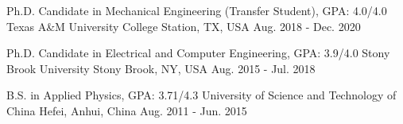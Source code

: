 

\begin{cventries}

  \cventry
    {Ph.D. Candidate in Mechanical Engineering (Transfer Student), GPA: 4.0/4.0} %
    {Texas A\&M University} %
    {College Station, TX, USA} %
    {Aug. 2018 - Dec. 2020} %
    {}

  \cventry
    {Ph.D. Candidate in Electrical and Computer Engineering, GPA: 3.9/4.0} %
    {Stony Brook University} %
    {Stony Brook, NY, USA} %
    {Aug. 2015 - Jul. 2018} %
    {}

  \cventry
    {B.S. in Applied Physics, GPA: 3.71/4.3} %
    {University of Science and Technology of China} %
    {Hefei, Anhui, China} %
    {Aug. 2011 - Jun. 2015} %
    {}

\end{cventries}
